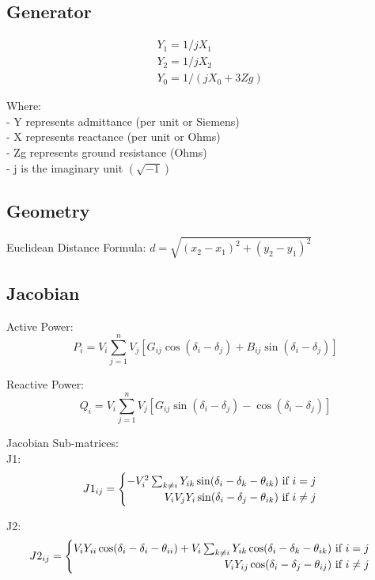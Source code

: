 \documentclass{article}
\begin{document}
	\subsection*{Generator}
	
	\begin{align*}
		& Y_1 = 1/jX_1 \\
		& Y_2 = 1/jX_2 \\
		& Y_0 = 1/(jX_0 + 3Zg)
	\end{align*}
	
	\noindent
	Where: \\
	- Y represents admittance (per unit or Siemens) \\
	- X represents reactance (per unit or Ohms) \\
	- Zg represents ground resistance (Ohms) \\
	- j is the imaginary unit $(\sqrt{-1})$ 
	
	\subsection*{Geometry}
	Euclidean Distance Formula: $d = \sqrt{(x_2 - x_1)^2 + (y_2 - y_1)^2}$ \\
	
	\subsection*{Jacobian}
	Active Power: 
	\[
	P_i = V_i \sum_{j=1}^{n} V_j[G_{ij} \cos(\delta_i - \delta_j) + B_{ij} \sin(\delta_i - \delta_j)]
	\]
	
	\noindent
	Reactive Power: 
	\[
	Q_i = V_i \sum_{j=1}^{n} V_j[G_{ij} \sin(\delta_i - \delta_j) - \cos(\delta_i - \delta_j)]
	\]
	
	\noindent
	Jacobian Sub-matrices: \\
	
	\noindent
	J1: 
	\[
	J1_{ij} = 
	\begin{cases}
		\hfill -V_i^2 \sum_{k \neq i} Y_{ik} \sin (\delta_i - \delta_k - \theta_{ik}) \text{ if } i = j  \\
		\hfill V_i V_j Y_i \sin(\delta_i - \delta_j - \theta_{ik}) \text{ if } i \neq j
	\end{cases}
	\]
	
	\noindent
	J2:
	\[
	J2_{ij} = 
	\begin{cases}
		\hfill V_i Y_{ii} \cos(\delta_i - \delta_i - \theta_{ii}) + V_i \sum_{k \neq i} Y_{ik} \cos(\delta_i - \delta_k - \theta_{ik}) \text{ if } i = j \\
		\hfill V_i Y_{ij} \cos(\delta_i - \delta_j - \theta_{ij}) \text{ if } i \neq j
	\end{cases}
	\]
	
\end{document}
